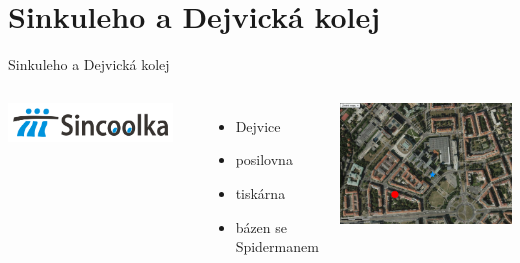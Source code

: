\documentclass{beamer}
\begin{document}
\section{Sinkuleho a Dejvická kolej}
\begin{frame}{Sinkuleho a Dejvická kolej}
	\begin{columns}[c]
			\begin{center}
				\includegraphics[width=0.9\textwidth]{logo_sin.png}
			\end{center}

			\begin{itemize}
				\item Dejvice
				\item posilovna
				\item tiskárna
				\item bázen se Spidermanem
			\end{itemize}
			\begin{center}
				\includegraphics[width=\textwidth]{mapa_sin.png}
			\end{center}
	\end{columns}
\end{frame}
\end{document}
